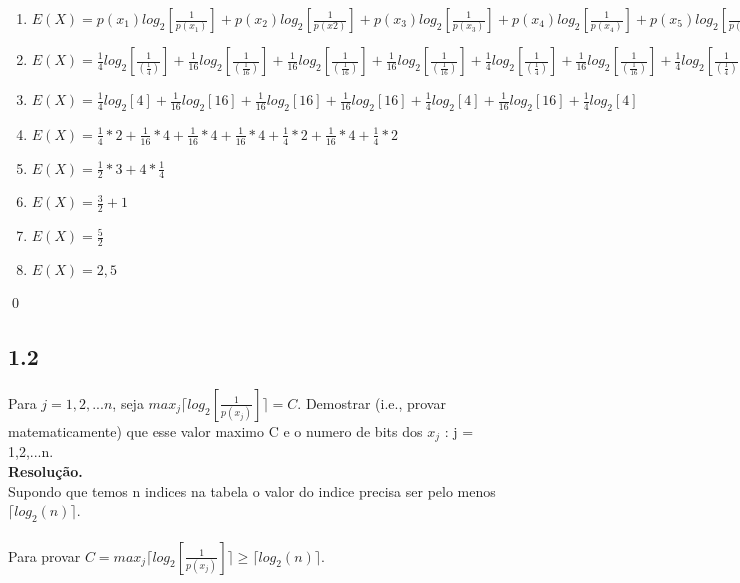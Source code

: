 \documentclass[12pt,letterpaper]{article}
\newcommand\answer{\textbf{Resolução.}\xspace}
\begin{document}
\begin{enumerate}
    \item $E(X) = p(x_1)log_2[\frac{1}{p(x_1)}] + p(x_2)log_2[\frac{1}{p(x2)}] + p(x_3)log_2[\frac{1}{p(x_3)}] + p(x_4)log_2[\frac{1}{p(x_4)}] + p(x_5)log_2[\frac{1}{p(x_5)}] + p(x_6)log_2[\frac{1}{p(x_6)}] + p(x_7)log_2[\frac{1}{p(x_7)}]$
    \item $E(X) = \frac{1}{4} log_2[\frac{1}{(\frac{1}{4})}] + \frac{1}{16} log_2[\frac{1}{(\frac{1}{16})}] + \frac{1}{16} log_2[\frac{1}{(\frac{1}{16})}] + \frac{1}{16} log_2[\frac{1}{(\frac{1}{16})}] + \frac{1}{4} log_2[\frac{1}{(\frac{1}{4})}] + \frac{1}{16} log_2[\frac{1}{(\frac{1}{16})}] + \frac{1}{4} log_2[\frac{1}{(\frac{1}{4})}]$
    \item $E(X) = \frac{1}{4}log_2[4] + \frac{1}{16} log_2[16] + \frac{1}{16} log_2[16] + \frac{1}{16} log_2[16] + \frac{1}{4}log_2[4] + \frac{1}{16} log_2[16] + \frac{1}{4}log_2[4]$
    \item $E(X) = \frac{1}{4}*2 + \frac{1}{16} *4 + \frac{1}{16} *4 + \frac{1}{16} *4 + \frac{1}{4}*2 + \frac{1}{16} *4 + \frac{1}{4}*2$
    \item $E(X) = \frac{1}{2}*3 + 4*\frac{1}{4}$
    \item $E(X) = \frac{3}{2} + 1$
    \item $E(X) = \frac{5}{2}$
    \item $E(X) = 2,5$
\end{enumerate}

\qed %

\subsection*{1.2}
Para $j = 1,2,...n$, seja $max_j \lceil log_2[\frac{1}{p(x_j)}] \rceil = C$. Demostrar (i.e., provar matematicamente) que esse valor maximo C e o numero de bits dos $x_j$ : j = 1,2,...n. \\

\answer \\

Supondo que temos n indices na tabela o valor do indice precisa ser pelo menos $\lceil log_2(n) \rceil$. \\ \\

Para provar $C = max_j \lceil log_2[\frac{1}{p(x_j)}] \rceil \geq \lceil log_2(n) \rceil $. \\ \\
\end{document}
